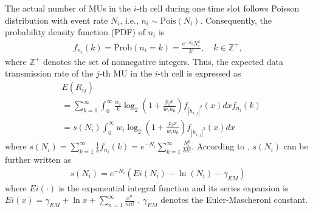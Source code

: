 \documentclass[journal]{IEEEtran}
\begin{document}
\begin{framed}
{  The actual number of MUs in the $i$-th cell during one time slot follows Poisson distribution with event rate $N_i$, i.e., $n_i \sim \mbox{Pois}\left(N_i\right)$. Consequently, the probability density function (PDF) of $n_i$ is 
\begin{align}
f_{n_i}\left(k\right) = \mbox{Prob}\left(n_i = k\right) = \frac{e^{-N_i}N_i^k}{k!}, \quad k \in \mathbb{Z}^+,
\end{align}
where $\mathbb{Z}^+$ denotes the set of nonnegative integers. Thus, the expected data transmission rate of the $j$-th MU in the $i$-th cell is expressed as
\begin{align}
& E\left(R_{ij}\right) \nonumber \\& = \sum\limits_{k = 1}^{\infty} \int_{0}^{\infty} \frac{w_i}{k}\log_2\left(1 + \frac{p_i x}{w_i n_0}\right)f_{\left|h_{i,j}\right|^2}\left(x\right)dx f_{n_i}\left(k\right) \nonumber \\
& = s\left(N_i\right)\int_{0}^{\infty} w_i\log_2\left(1 + \frac{p_i x}{w_i n_0} \right)f_{\left|h_{i,j}\right|^2}\left(x\right)dx
\end{align}
where $s\left(N_i\right) = \sum\limits_{k = 1}^{\infty} \frac{1}{k}f_{n_i}\left(k\right) = e^{-N_i}\sum\limits_{k = 1}^{\infty}\frac{N_i^k}{kk!}$. According to \cite{MAbramowitz}, $s\left(N_i\right)$ can be further written as
\begin{align}
s\left(N_i\right) = e^{-N_i}\left(Ei\left(N_i\right) - \ln\left(N_i\right) - \gamma_{EM}\right)
\end{align}
where $Ei\left(\cdot\right)$ is the exponential integral function and its series expansion is $Ei\left(x\right) = \gamma_{EM} + \ln x + \sum\limits_{n = 1}^{\infty}\frac{x^n}{nn!}$ \cite[5.1.10]{MAbramowitz}. $\gamma_{EM}$ denotes the Euler-Mascheroni constant.
}
\end{framed}
\end{document}
